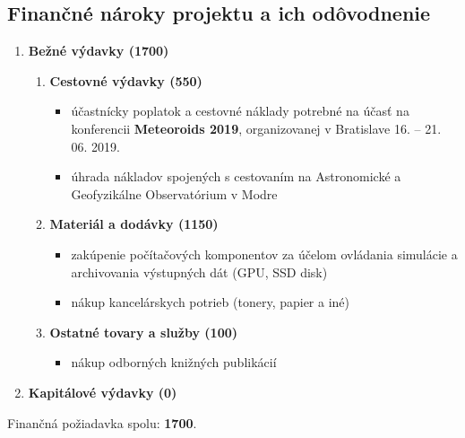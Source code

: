 \subsection{Finančné nároky projektu a ich
odôvodnenie}\label{finanux10dnuxe9-nuxe1roky-projektu-a-ich-oduxf4vodnenie}

\begin{enumerate}
\def\labelenumi{\arabic{enumi}.}
\tightlist
\item
  \textbf{Bežné výdavky (\SI{1700}{\eur})}

  \begin{enumerate}
  \def\labelenumii{\alph{enumii}.}
  \tightlist
  \item
    \textbf{Cestovné výdavky (\SI{550}{\eur})}

    \begin{itemize}
    \tightlist
    \item
      účastnícky poplatok a cestovné náklady potrebné na účasť na
      konferencii \textbf{Meteoroids 2019}, organizovanej v Bratislave
      16. -- 21. 06. 2019.
    \item
      úhrada nákladov spojených s cestovaním na Astronomické a
      Geofyzikálne Observatórium v Modre
    \end{itemize}
  \item
    \textbf{Materiál a dodávky (\SI{1150}{\eur})}

    \begin{itemize}
    \tightlist
    \item
      zakúpenie počítačových komponentov za účelom ovládania simulácie a
      archivovania výstupných dát (GPU, SSD disk)
    \item
      nákup kancelárskych potrieb (tonery, papier a iné)
    \end{itemize}
  \item
    \textbf{Ostatné tovary a služby (\SI{100}{\eur})}

    \begin{itemize}
    \tightlist
    \item
      nákup odborných knižných publikácií
    \end{itemize}
  \end{enumerate}
\item
  \textbf{Kapitálové výdavky (\SI{0}{\eur})}
\end{enumerate}

Finančná požiadavka spolu: \textbf{\SI{1700}{\eur}}.
